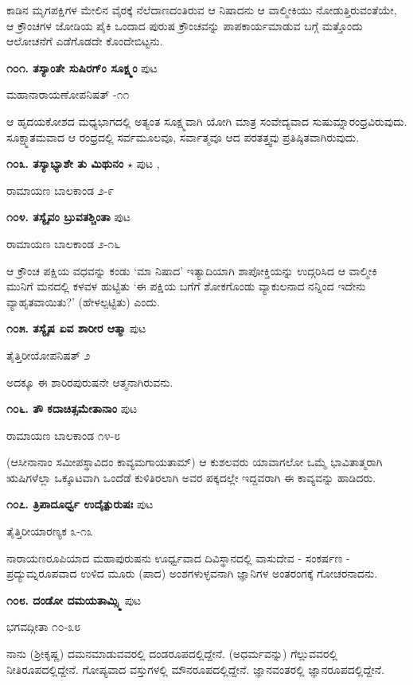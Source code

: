 ಕಾಡಿನ ಮೃಗಪಕ್ಷಿಗಳ ಮೇಲಿನ ವೈರಕ್ಕೆ ನೆಲೆದಾಣದಂತಿರುವ ಆ ನಿಷಾದನು ಆ ವಾಲ್ಮೀಕಿಯು ನೋಡುತ್ತಿರುವಂತೆಯೇ, ಆ ಕ್ರೌಂಚಗಳ ಜೋಡಿಯ ಪೈಕಿ ಒಂದಾದ ಪುರುಷ ಕ್ರೌಂಚವನ್ನು ಪಾಪಕಾರ್ಯಮಾಡುವ ಬಗ್ಗೆ ಮತ್ತೊಂದು ಆಲೋಚನೆಗೆ ಎಡೆಗೊಡದೇ ಕೊಂದೇಬಿಟ್ಟನು.

\medskip
\noindent\textbf{೧೦೧. ತಸ್ಯಾಂತೇ ಸುಷಿರಗ್ಂ ಸೂಕ್ಷ್ಮಂ} \hfill ಪುಟ \pageref{27}

\hfill ಮಹಾನಾರಾಯಣೋಪನಿಷತ್ -೧೧

ಆ ಹೃದಯಕೋಶದ ಮಧ್ಯಭಾಗದಲ್ಲಿ ಅತ್ಯಂತ ಸೂಕ್ಷ್ಮವಾಗಿ ಯೋಗಿ ಮಾತ್ರ ಸಂವೇದ್ಯವಾದ ಸುಷುಮ್ನಾರಂಧ್ರವಿರುವುದು. ಸೂಕ್ಷ್ಮಾತಮವಾದ ಆ ರಂಧ್ರದಲ್ಲಿ ಸರ್ವಮೂಲವೂ, ಸರ್ವಾತ್ಮವೂ ಆದ ಪರತತ್ತ್ವವು ಪ್ರತಿಷ್ಠಿತವಾಗಿರುವುದು.

\medskip
\noindent\textbf{೧೦೩. ತಸ್ಯಾಭ್ಯಾಶೇ ತು ಮಿಥುನಂ} $\star$ \hfill ಪುಟ \pageref{156a},\pageref{198a}

\hfill ರಾಮಾಯಣ ಬಾಲಕಾಂಡ ೨-೯

\medskip
\noindent\textbf{೧೦೪. ತಸ್ಯೈವಂ ಬ್ರುವತಶ್ಚಿಂತಾ} \hfill ಪುಟ \pageref{201a}

\hfill ರಾಮಾಯಣ ಬಾಲಕಾಂಡ ೨-೧೬

ಆ ಕ್ರೌಂಚ ಪಕ್ಷಿಯ ವಧವನ್ನು ಕಂಡು `ಮಾ ನಿಷಾದ' ಇತ್ಯಾದಿಯಾಗಿ ಶಾಪೋಕ್ತಿಯನ್ನು ಉದ್ಗರಿಸಿದ ಆ ವಾಲ್ಮೀಕಿ ಮುನಿಗೆ ಮನದಲ್ಲಿ ಕಳವಳ ಹುಟ್ಟಿತು `ಈ ಪಕ್ಷಿಯ ಬಗೆಗೆ ಶೋಕಗೊಂಡು ವ್ಯಾಕುಲನಾದ ನನ್ನಿಂದ ಇದೇನು ವ್ಯಾಹೃತವಾಯಿತು?' (ಹೇಳಲ್ಪಟ್ಟಿತು) ಎಂದು.

\medskip
\noindent\textbf{೧೦೫. ತಸ್ಯೈಷ ಏವ ಶಾರೀರ ಆತ್ಮಾ} \hfill ಪುಟ \pageref{76a}

\hfill ತೈತ್ತಿರೀಯೋಪನಿಷತ್ ೨

ಅದಕ್ಕೂ ಈ ಶಾರಿರಪುರುಷನೇ ಆತ್ಮನಾಗಿರುವನು.

\medskip
\noindent\textbf{೧೦೬. ತೌ ಕದಾಚಿತ್ಸಮೇತಾನಾಂ} \hfill ಪುಟ \pageref{189}

\hfill ರಾಮಾಯಣ ಬಾಲಕಾಂಡ ೧೪-೮

(ಆಸೀನಾನಾಂ ಸಮೀಪಸ್ಥಾವಿದಂ ಕಾವ್ಯಮಗಾಯತಾಮ್) ಆ ಕುಶಲವರು ಯಾವಾಗಲೋ ಒಮ್ಮೆ ಭಾವಿತಾತ್ಮರಾಗಿ ಋಷಿಗಳೆಲ್ಲಾ ಒಕ್ಕೂಟವಾಗಿ ಒಂದೆಡೆ ಕುಳಿತಿರಲಾಗಿ ಅವರ ಪಕ್ಕದಲ್ಲೇ ಇದ್ದವರಾಗಿ ಈ ಕಾವ್ಯವನ್ನು ಹಾಡಿದರು.

\medskip
\noindent\textbf{೧೦೭. ತ್ರಿಪಾದೂರ್ಧ್ವ ಉದೈತ್ಪುರುಷಃ} \hfill ಪುಟ \pageref{252a}

\hfill ತೈತ್ತಿರೀಯಾರಣ್ಯಕ ೩-೧೩

ನಾರಾಯಣರೂಪಿಯಾದ ಮಹಾಪುರುಷನು ಊರ್ಧ್ವವಾದ ದಿವಿಸ್ಥಾನದಲ್ಲಿ ವಾಸುದೇವ - ಸಂಕರ್ಷಣ - ಪ್ರದ್ಯುಮ್ನರೂಪವಾದ ಉಳಿದ ಮೂರು (ಪಾದ) ಅಂಶಗಳುಳ್ಳವನಾಗಿ ಜ್ಞಾನಿಗಳ ಅಂತರಂಗಕ್ಕೆ ಗೋಚರನಾದನು. 

\medskip
\noindent\textbf{೧೦೮. ದಂಡೋ ದಮಯತಾಮ್ಸ್ಮಿ} \hfill ಪುಟ \pageref{93}

\hfill ಭಗವದ್ಗೀತಾ ೧೦-೩೮

ನಾನು (ಶ್ರೀಕೃಷ್ಣ) ದಮನಮಾಡುವವರಲ್ಲಿ ದಂಡರೂಪದಲ್ಲಿದ್ದೇನೆ. (ಅಧರ್ಮವನ್ನು) ಗೆಲ್ಲುವವರಲ್ಲಿ ನೀತಿರೂಪದಲ್ಲಿದ್ದೇನೆ. ಗೋಪ್ಯವಾದ ವಸ್ತುಗಳಲ್ಲಿ ಮೌನರೂಪದಲ್ಲಿದ್ದೇನೆ. ಜ್ಞಾನವಂತರಲ್ಲಿ ಜ್ಞಾನರೂಪದಲ್ಲಿದ್ದೇನೆ.

